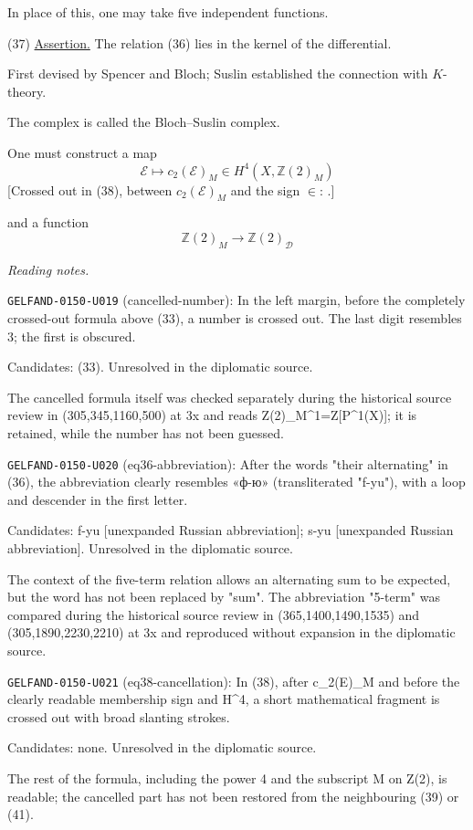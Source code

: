 In place of this, one may take five independent functions.

(37) \underline{Assertion.} The relation (36) lies in the kernel of the differential.

First devised by Spencer and Bloch; Suslin established the connection with $K$-theory.

The complex is called the Bloch--Suslin complex.

One must construct a map
\begin{equation*}
\mathcal E\longmapsto c_2(\mathcal E)_M\in H^4(X,\mathbb Z(2)_M)\tag{38}
\end{equation*}
[Crossed out in (38), between $c_2(\mathcal E)_M$ and the sign $\in$:
.]

and a function
\begin{equation*}
\mathbb Z(2)_M\longrightarrow\mathbb Z(2)_{\mathcal D}\tag{39}
\end{equation*}


\par\smallskip\noindent\textit{Reading notes.}\par
\noindent\texttt{GELFAND-0150-U019} (cancelled-number): In the left margin, before the completely crossed-out formula above (33), a number is crossed out. The last digit resembles 3; the first is obscured.\par
Candidates: (33). Unresolved in the diplomatic source.\par
The cancelled formula itself was checked separately during the historical source review in (305,345,1160,500) at 3x and reads Z(2)\_M\textasciicircum{}1=Z[P\textasciicircum{}1(X)]; it is retained, while the number has not been guessed.\par
\noindent\texttt{GELFAND-0150-U020} (eq36-abbreviation): After the words "their alternating" in (36), the abbreviation clearly resembles «ф-ю» (transliterated "f-yu"), with a loop and descender in the first letter.\par
Candidates: f-yu [unexpanded Russian abbreviation]; s-yu [unexpanded Russian abbreviation]. Unresolved in the diplomatic source.\par
The context of the five-term relation allows an alternating sum to be expected, but the word has not been replaced by "sum". The abbreviation "5-term" was compared during the historical source review in (365,1400,1490,1535) and (305,1890,2230,2210) at 3x and reproduced without expansion in the diplomatic source.\par
\noindent\texttt{GELFAND-0150-U021} (eq38-cancellation): In (38), after c\_2(E)\_M and before the clearly readable membership sign and H\textasciicircum{}4, a short mathematical fragment is crossed out with broad slanting strokes.\par
Candidates: none. Unresolved in the diplomatic source.\par
The rest of the formula, including the power 4 and the subscript M on Z(2), is readable; the cancelled part has not been restored from the neighbouring (39) or (41).\par


